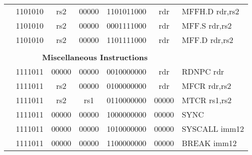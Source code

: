 \begin{table}[p]
\begin{small}
\begin{center}
\begin{tabular}{rcccccccccl}
&
\multicolumn{2}{|c|}{1101010} &
\multicolumn{1}{c|}{rs2} &
\multicolumn{1}{c|}{00000} &
\multicolumn{4}{c|}{1101011000} &
\multicolumn{1}{c|}{rdr} & MFFH.D rdr,rs2 \\
\cline{2-10}
  

&
\multicolumn{2}{|c|}{1101010} &
\multicolumn{1}{c|}{rs2} &
\multicolumn{1}{c|}{00000} &
\multicolumn{4}{c|}{0001111000} &
\multicolumn{1}{c|}{rdr} & MFF.S rdr,rs2 \\
\cline{2-10}
  

&
\multicolumn{2}{|c|}{1101010} &
\multicolumn{1}{c|}{rs2} &
\multicolumn{1}{c|}{00000} &
\multicolumn{4}{c|}{1101111000} &
\multicolumn{1}{c|}{rdr} & MFF.D rdr,rs2 \\
\cline{2-10}
  

&
\multicolumn{9}{c}{} & \\
&
\multicolumn{9}{c}{\bf Miscellaneous Instructions} & \\
\cline{2-10}
  

&
\multicolumn{2}{|c|}{1111011} &
\multicolumn{1}{c|}{00000} &
\multicolumn{1}{c|}{00000} &
\multicolumn{4}{c|}{0010000000} &
\multicolumn{1}{c|}{rdr} & RDNPC rdr \\
\cline{2-10}
  

&
\multicolumn{2}{|c|}{1111011} &
\multicolumn{1}{c|}{rs2} &
\multicolumn{1}{c|}{00000} &
\multicolumn{4}{c|}{0100000000} &
\multicolumn{1}{c|}{rdr} & MFCR rdr,rs2 \\
\cline{2-10}
  

&
\multicolumn{2}{|c|}{1111011} &
\multicolumn{1}{c|}{rs2} &
\multicolumn{1}{c|}{rs1} &
\multicolumn{4}{c|}{0110000000} &
\multicolumn{1}{c|}{00000} & MTCR rs1,rs2 \\
\cline{2-10}
  

&
\multicolumn{2}{|c|}{1111011} &
\multicolumn{1}{c|}{00000} &
\multicolumn{1}{c|}{00000} &
\multicolumn{4}{c|}{1000000000} &
\multicolumn{1}{c|}{00000} & SYNC  \\
\cline{2-10}
  

&
\multicolumn{2}{|c|}{1111011} &
\multicolumn{1}{c|}{00000} &
\multicolumn{1}{c|}{00000} &
\multicolumn{4}{c|}{1010000000} &
\multicolumn{1}{c|}{00000} & SYSCALL imm12 \\
\cline{2-10}
  

&
\multicolumn{2}{|c|}{1111011} &
\multicolumn{1}{c|}{00000} &
\multicolumn{1}{c|}{00000} &
\multicolumn{4}{c|}{1100000000} &
\multicolumn{1}{c|}{00000} & BREAK imm12 \\
\cline{2-10}
  


\end{tabular}
\end{center}
\end{small}
\end{table}
